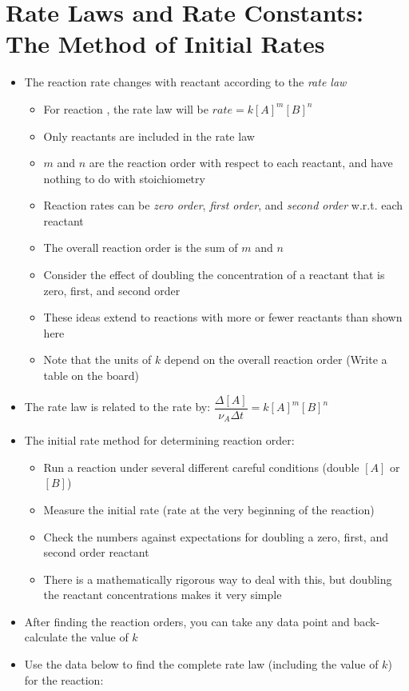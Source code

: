 \documentclass[12pt, openany, letterpaper]{memoir}
\begin{document}
\section{Rate Laws and Rate Constants: The Method of Initial Rates}
\begin{itemize}
	\item The reaction rate changes with reactant  according to the \emph{rate law}
	\begin{itemize}
		\item For reaction , the rate law will be $rate=k\left[A\right]^m\left[B\right]^n$
		\item Only reactants are included in the rate law
		\item $m$ and $n$ are the reaction order with respect to each reactant, and have nothing to do with stoichiometry
		\item Reaction rates can be \emph{zero order}, \emph{first order}, and \emph{second order} w.r.t. each reactant
		\item The overall reaction order is the sum of $m$ and $n$
		\item Consider the effect of doubling the concentration of a reactant that is zero, first, and second order
		\item These ideas extend to reactions with more or fewer reactants than shown here
	  \item Note that the units of $k$ depend on the overall reaction order (Write a table on the board)
	\end{itemize}
	\item The rate law is related to the rate by: $\dfrac{\Delta\left[A\right]}{\nu_A\Delta t}=k\left[A\right]^m\left[B\right]^n$
	\item The initial rate method for determining reaction order:
	\begin{itemize}
		\item Run a reaction under several different careful conditions (double $\left[A\right]$ or $\left[B\right]$)
		\item Measure the initial rate (rate at the very beginning of the reaction)
		\item Check the numbers against expectations for doubling a zero, first, and second order reactant
		\item There is a mathematically rigorous way to deal with this, but doubling the reactant concentrations makes it very simple
	\end{itemize}
	\item After finding the reaction orders, you can take any data point and back-calculate the value of $k$
	\item Use the data below to find the complete rate law (including the value of $k$) for the reaction:
	

\end{itemize}
\end{document}
